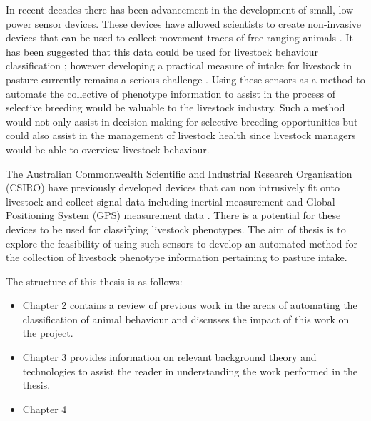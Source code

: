In recent decades there has been advancement in the development of small, low power sensor devices. These devices have allowed scientists to create non-invasive devices that can be used to collect movement traces of free-ranging animals \cite{Anthony2012}. It has been suggested that this data could be used for livestock behaviour classification \cite{Guo2006}; however developing a practical measure of intake for livestock in pasture currently remains a serious challenge \cite{Cottle2013}. Using these sensors as a method to automate the collective of phenotype information to assist in the process of selective breeding would be valuable to the livestock industry. Such a method would not only assist in decision making for selective breeding opportunities but could also assist in the management of livestock health since livestock managers would be able to overview livestock behaviour. 

The Australian Commonwealth Scientific and Industrial Research Organisation (CSIRO) have previously developed devices that can non intrusively fit onto livestock and collect signal data including inertial measurement and Global Positioning System (GPS) measurement data \cite{Guo2006}. There is a potential for these devices to be used for classifying livestock phenotypes. The aim of thesis is to explore the feasibility of using such sensors to develop an automated method for the collection of livestock phenotype information pertaining to pasture intake. 

The structure of this thesis is as follows:

\begin{itemize}
\item Chapter 2 contains a review of previous work in the areas of automating the classification of animal behaviour and discusses the impact of this work on the project. 

\item Chapter 3 provides information on relevant background theory and technologies to assist the reader in understanding the work performed in the thesis.

\item Chapter 4

\end{itemize}
